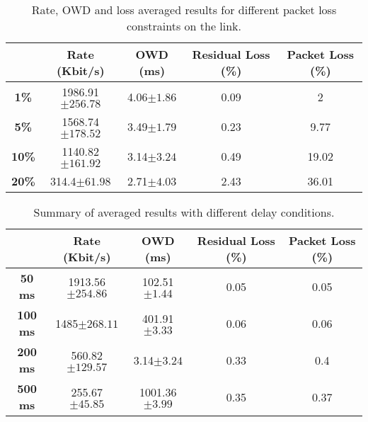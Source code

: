 \documentclass[11pt]{amsart}
\begin{document}
\begin{table}[h]
\begin{center}
\begin{tabular}{ |c|c|c|c|c| }
\hline
 & \textbf{Rate (Kbit/s)}  & \textbf{OWD (ms)} & \textbf{Residual Loss (\%)} & \textbf{Packet Loss (\%)}\\ \hline
 \textbf{1\%} & 1986.91$\pm256.78$ & 4.06$\pm1.86$ & 0.09 & 2 \\ \hline
 \textbf{5\%} & 1568.74$\pm178.52$ &3.49$\pm1.79$ & 0.23 & 9.77 \\ \hline
 \textbf{10\%} & 1140.82$\pm161.92$ & 3.14$\pm3.24$ & 0.49 & 19.02 \\ \hline
 \textbf{20\%} & 314.4$\pm61.98$ & 2.71$\pm4.03$ & 2.43 & 36.01 \\ \hline
\end{tabular}
\caption[Rate, OWD and loss averaged results for different packet loss constraints on the link]{Rate, OWD and loss averaged results for different packet loss constraints on the link.}
\end{center}
\end{table}

\begin{table}[h]
\begin{center}
\begin{tabular}{ |c|c|c|c|c| }
\hline
 & \textbf{Rate (Kbit/s)}  & \textbf{OWD (ms)} & \textbf{Residual Loss (\%)} & \textbf{Packet Loss (\%)}\\ \hline
 \textbf{50 ms} & 1913.56$\pm254.86$ &  102.51$\pm1.44$ & 0.05 & 0.05 \\ \hline
 \textbf{100 ms} & 1485$\pm268.11$ & 401.91$\pm3.33$ & 0.06 & 0.06 \\ \hline
 \textbf{200 ms} & 560.82$\pm129.57$ & 3.14$\pm3.24$ & 0.33 & 0.4 \\ \hline
 \textbf{500 ms} & 255.67$\pm45.85$ & 1001.36$\pm3.99$ & 0.35 & 0.37 \\ \hline
\end{tabular}
\caption[Summary of averaged results with different delay conditions]{Summary of averaged results with different delay conditions.}
\end{center}
\end{table}
\end{document}
